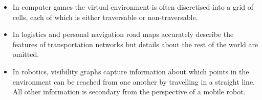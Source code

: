 \begin{itemize}
\item In computer games the virtual environment is often discretised into a grid of 
cells, each of which is either traversable or non-traversable. 
\item In logistics and personal navigation road maps accurately describe the
features of transportation networks but details about the rest of the world
are omitted.
\item In robotics,  visibility graphs capture information about which points
in the environment can be reached from one another by travelling in a straight line.
All other information is secondary from the perspective of a mobile robot.
\end{itemize}
%
